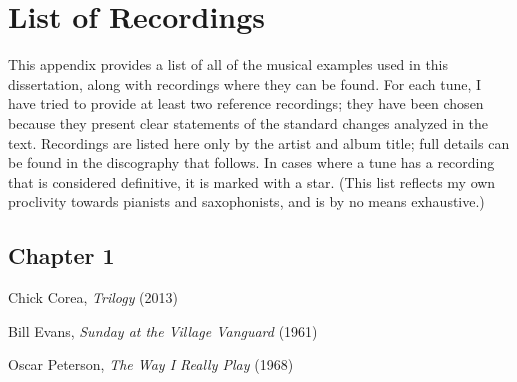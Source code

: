 \chapter{List of Recordings}

\singlespacing

%
%
This appendix provides a list of all of the musical examples used in this
dissertation, along with recordings where they can be found. For each tune, I
have tried to provide at least two reference recordings; they have been
chosen because they present clear statements of the standard changes analyzed
in the text. Recordings are listed here only by the artist and album title;
full details can be found in the discography that follows. In cases where a
tune has a recording that is considered definitive, it is marked with a star.
(This list reflects my own proclivity towards pianists and saxophonists, and is by
no means exhaustive.)

\section*{Chapter 1}

\vspace{-1em}

\begin{compactitem}
    \item Chick Corea, \emph{Trilogy} (2013)
    \item Bill Evans, \emph{Sunday at the Village Vanguard} (1961)
    \item Oscar Peterson, \emph{The Way I Really Play} (1968)
\end{compactitem}
\nocite{corea:trilogy,evans:sunday,peterson:reallyplay}


